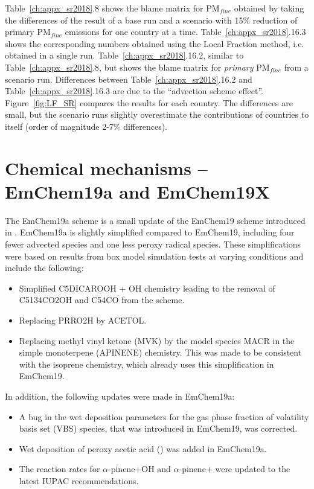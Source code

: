 Table~\ref{ch:appx_sr2018}.8 shows the blame matrix for PM$_{fine}$
obtained by taking the differences of the result of a base run and a
scenario with 15\% reduction of primary PM$_{fine}$ emissions for one
country at a time.  Table~\ref{ch:appx_sr2018}.16.3 shows the corresponding
numbers obtained using the Local Fraction method, i.e. obtained in
a single run.  Table~\ref{ch:appx_sr2018}.16.2, similar to 
Table~\ref{ch:appx_sr2018}.8, but shows the blame matrix for {\sl primary}
PM$_{fine}$ from a scenario run.  Differences between 
Table~\ref{ch:appx_sr2018}.16.2 and Table~\ref{ch:appx_sr2018}.16.3 are due to the
``advection scheme effect''. Figure~\ref{fig:LF_SR} compares the results for each country. The differences are small, but the scenario
runs slightly overestimate the contributions of countries to itself (order of magnitude 2-7\% differences).

\section{Chemical mechanisms -- EmChem19a and EmChem19X}
\label{sec:Chems}

The EmChem19a scheme \citep{BergstromEmChem2020} is a small update of
the EmChem19 scheme introduced in \citet{R2019:ModDev}. 
EmChem19a is slightly simplified compared to EmChem19, including 
four fewer advected species and one less peroxy radical species. These 
simplifications were based on results from box model simulation tests at 
varying conditions and include the following:

\begin{itemize}
\item
Simplified C5DICAROOH + OH chemistry leading to the removal of C5134CO2OH
and C54CO from the scheme.

\item
Replacing PRRO2H by ACETOL.

\item
Replacing methyl vinyl ketone (MVK) by the model species MACR in the
simple monoterpene (APINENE) chemistry. This was made to be consistent
with the isoprene chemistry, which already uses this simplification
in EmChem19.

\end{itemize}

In addition, the following updates were made in EmChem19a:
\begin{itemize}
\item
A bug in the wet deposition parameters for the gas phase fraction of
volatility basis set (VBS) species, that was introduced in EmChem19,
was corrected.

\item
Wet deposition of peroxy acetic acid () was added in EmChem19a.

\item
The reaction rates for $\alpha$-pinene$+$OH and $\alpha$-pinene$+$ were 
updated to the latest IUPAC recommendations.

\end{itemize}


